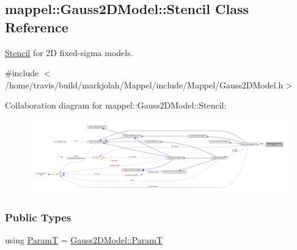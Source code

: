 \hypertarget{classmappel_1_1Gauss2DModel_1_1Stencil}{}\subsection{mappel\+:\+:Gauss2\+D\+Model\+:\+:Stencil Class Reference}
\label{classmappel_1_1Gauss2DModel_1_1Stencil}


\hyperlink{classmappel_1_1Gauss2DModel_1_1Stencil}{Stencil} for 2D fixed-\/sigma models.  




{\ttfamily \#include $<$/home/travis/build/markjolah/\+Mappel/include/\+Mappel/\+Gauss2\+D\+Model.\+h$>$}



Collaboration diagram for mappel\+:\+:Gauss2\+D\+Model\+:\+:Stencil\+:\nopagebreak
\begin{figure}[H]
\begin{center}
\leavevmode
\includegraphics[width=350pt]{classmappel_1_1Gauss2DModel_1_1Stencil__coll__graph}
\end{center}
\end{figure}
\subsubsection*{Public Types}
\begin{DoxyCompactItemize}
\item 
using \hyperlink{classmappel_1_1Gauss2DModel_1_1Stencil_af4899fe2829b3bf1c685cd6bfd1b602e}{ParamT} = \hyperlink{classmappel_1_1PointEmitterModel_a665ec6aea3aac139bb69a23c06d4b9a1}{Gauss2\+D\+Model\+::\+ParamT}
\end{DoxyCompactItemize}
